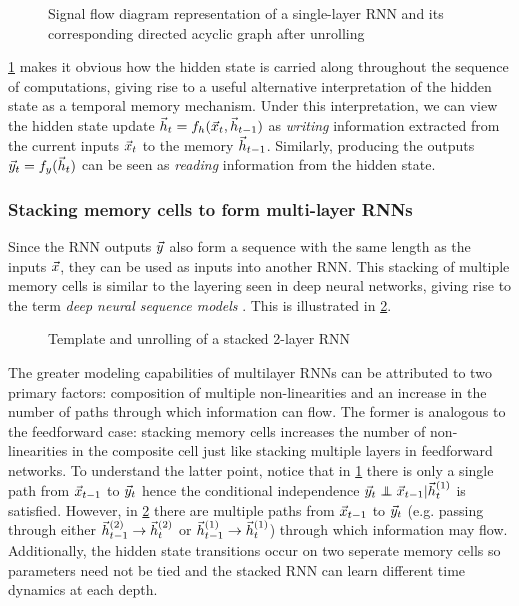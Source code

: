 \begin{figure}[htpb]
  \centering
  \resizebox{4.5in}{!}{}
  \caption{Signal flow diagram representation of a single-layer RNN and its
  corresponding directed acyclic graph after unrolling}
  \label{fig:rnn-single-unrolled}
\end{figure}

\cref{fig:rnn-single-unrolled} makes it obvious how the hidden state is
carried along throughout the sequence of computations, giving rise to a useful
alternative interpretation of the hidden state as a temporal memory mechanism.
Under this interpretation, we can view the hidden state update $\vec{h}_t = f_h
(\vec{x}_t, \vec{h}_{t-1})$ as \emph{writing} information extracted from the
current inputs $\vec{x}_t$ to the memory $\vec{h}_{t-1}$. Similarly, producing
the outputs $\vec{y}_t = f_y (\vec{h}_t)$ can be seen as \emph{reading}
information from the hidden state.


\subsubsection{Stacking memory cells to form multi-layer RNNs}

Since the RNN outputs $\vec{y}$ also form a sequence with the same length as
the inputs $\vec{x}$, they can be used as inputs into another RNN. This
stacking of multiple memory cells is similar to the layering seen in deep
neural networks, giving rise to the term \emph{deep neural sequence models}
. This is illustrated in \cref{fig:rnn-multi-unrolled}.

\begin{figure}[htpb]
    \centering
    \resizebox{4.5in}{!}{}
    \caption{Template and unrolling of a stacked 2-layer RNN}
    \label{fig:rnn-multi-unrolled}
\end{figure}

The greater modeling capabilities of multilayer RNNs can be attributed to two
primary factors: composition of multiple non-linearities and an increase in the
number of paths through which information can flow. The former is analogous to
the feedforward case: stacking memory cells increases the number of
non-linearities in the composite cell just like stacking multiple layers in
feedforward networks. To understand the latter point, notice that in
\cref{fig:rnn-single-unrolled} there is only a single path from
$\vec{x}_{t-1}$ to $\vec{y}_{t}$ hence the conditional independence
$\y_{t} \independent \x_{t-1} | \h^{(1)}_t$ is satisfied.
However, in \cref{fig:rnn-multi-unrolled} there are multiple paths from
$\vec{x}_{t-1}$ to $\vec{y}_{t}$ (e.g. passing through either
$\vec{h}^{(2)}_{t-1} \to \vec{h}^{(2)}_t$ or $\vec{h}^{(1)}_{t-1} \to
\vec{h}^{(1)}_t$) through which information may flow. Additionally, the
hidden state transitions occur on two seperate memory cells so parameters
need not be tied and the stacked RNN can learn different time dynamics
at each depth.

